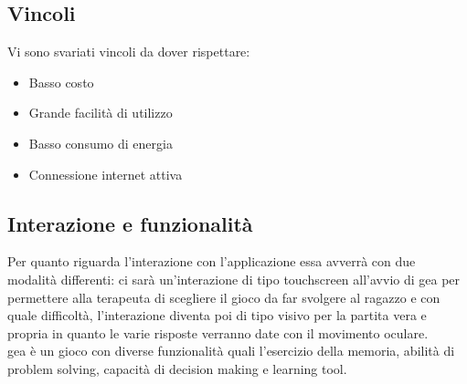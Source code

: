 \subsection{Vincoli} \label{subsec:vincoli}
Vi sono svariati vincoli da dover rispettare:
\begin{itemize}
\item Basso costo
\item Grande facilità di utilizzo
\item Basso consumo di energia
\item Connessione internet attiva
\end{itemize}

\subsection{Interazione e funzionalità} \label{subsec:intfun}
Per quanto riguarda l'interazione con l'applicazione essa avverrà con due modalità differenti: ci sarà un'interazione di tipo touchscreen all'avvio di \acs{gea} per permettere alla terapeuta di scegliere il gioco da far svolgere al ragazzo e con quale difficoltà, l'interazione diventa poi di tipo visivo per la partita vera e propria in quanto le varie risposte verranno date con il movimento oculare.\\

\acs{gea} è un gioco con diverse funzionalità quali l'esercizio della memoria, abilità di problem solving, capacità di decision making e learning tool.


